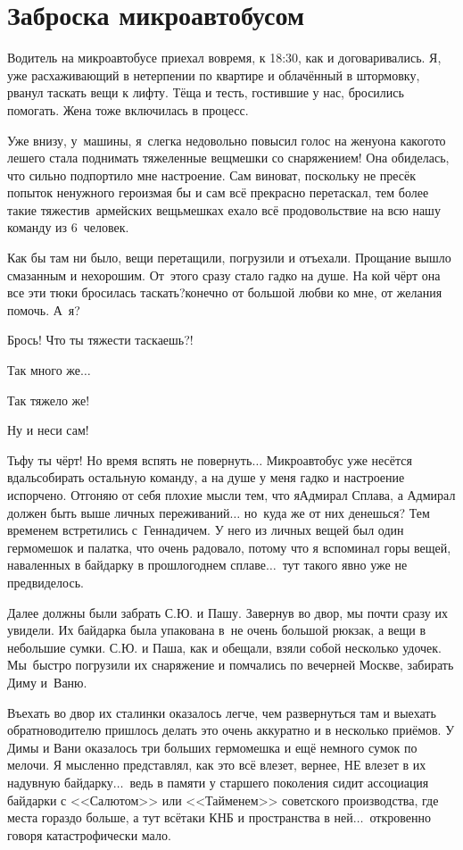 \chapter{Заброска микроавтобусом} 
\vspace{-1cm}
\vepsianrose

Водитель на микроавтобусе приехал вовремя, к 18:30, как и договаривались. Я, уже расхаживающий в нетерпении по квартире и облачённый в штормовку, рванул таскать вещи к лифту. Тёща и тесть, гостившие у нас, бросились помогать. Жена тоже включилась в процесс. 

Уже внизу, у~машины, я~слегка недовольно повысил голос на жену\mdash она какого\sdash то лешего стала поднимать тяжеленные вещмешки со снаряжением! Она обиделась, что сильно подпортило мне настроение. Сам виноват, поскольку не пресёк попыток ненужного героизма\mdash я бы и сам всё прекрасно перетаскал, тем более такие тяжести\mdash в~армейских вещьмешках ехало всё продовольствие на всю нашу команду из 6~человек. 

Как бы там ни было, вещи перетащили, погрузили и отъехали. Прощание вышло смазанным и нехорошим. От~этого сразу стало гадко на душе. На кой чёрт она все эти тюки бросилась таскать?\mdash конечно от большой любви ко мне, от желания помочь. А~я?

\diagdash Брось! Что ты тяжести таскаешь?! 

\diagdash Так много же$\ldots$

\diagdash Так тяжело же!

\diagdash Ну и неси сам!

Тьфу ты чёрт! Но время вспять не повернуть$\ldots$ Микроавтобус уже несётся вдаль\mdash собирать остальную команду, а на душе у меня гадко и настроение испорчено. Отгоняю от себя плохие мысли тем, что я\mdash Адмирал Сплава, а Адмирал должен быть выше личных переживаний$\ldots$ но~куда же от них денешься? Тем временем встретились с~Геннадичем. У него из личных вещей был один гермомешок и палатка, что очень радовало, потому что я вспоминал горы вещей, наваленных в байдарку в прошлогоднем сплаве$\ldots$~тут такого явно уже не предвиделось.  

Далее должны были забрать С.Ю. и Пашу. Завернув во двор, мы почти сразу их увидели. Их байдарка была упакована в~не очень большой рюкзак, а вещи в небольшие сумки. С.Ю. и Паша, как и обещали, взяли собой несколько удочек. Мы~быстро погрузили их снаряжение и помчались по вечерней Москве, забирать Диму и~Ваню. 

Въехать во двор их сталинки оказалось легче, чем развернуться там и выехать обратно\mdash водителю пришлось делать это очень аккуратно и в несколько приёмов. У Димы и Вани оказалось три больших гермомешка и ещё немного сумок по мелочи. Я мысленно представлял, как это всё влезет, вернее, НЕ влезет в их надувную байдарку$\ldots$~ведь в памяти у старшего поколения сидит ассоциация байдарки с <<Салютом>> или <<Тайменем>> советского производства, где места гораздо больше, а тут всё\sdash таки КНБ и пространства в ней$\ldots$~откровенно говоря катастрофически мало.

